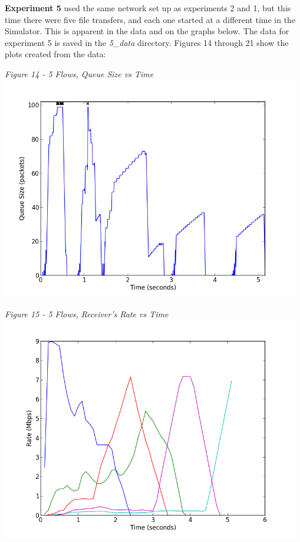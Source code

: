 \documentclass[11pt]{article}
\begin{document}
\textbf{Experiment 5} used the same network set up as experiments 2 and 1, but this time there were five file transfers, and each one started at a different time in the Simulator. This is apparent in the data and on the graphs below. The data for experiment 5 is saved in the \textit{5\_data} directory. Figures 14 through 21 show the plots created from the data:

\vspace{0.25cm}
\textit{Figure 14 - 5 Flows, Queue Size vs Time}
\\
\includegraphics[width=13cm]{5_data/5-queue}
\vspace{0.25cm}

\textit{Figure 15 - 5 Flows, Receiver's Rate vs Time}
\\
\includegraphics[width=13cm]{5_data/5-rate}
\vspace{0.25cm}
\end{document}
